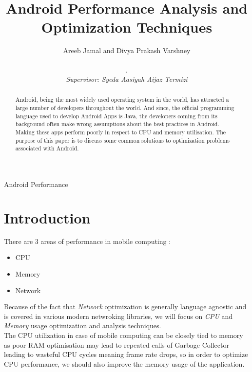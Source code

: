 \documentclass[journal]{IEEEtran}
\begin{document}
\title{Android Performance Analysis and \\ Optimization Techniques}

\author{Areeb Jamal and Divya Prakash Varshney \\
	 \\
	 \color{white}.\\\color{black}
 	\textit{Supervisor: Syeda Aasiyah Aijaz Termizi}}
 


%
{Android Performance}


\maketitle


\begin{abstract}
Android, being the most widely used operating system in the world, has attracted a large number of developers throughout the world. And since, the official programming language used to develop Android Apps is Java, the developers coming from its background often make wrong assumptions about the best practices in Android. Making these apps perform poorly in respect to CPU and memory utilisation. The purpose of this paper is to discuss some common solutions to optimization problems associated with Android.
\end{abstract}


\section{Introduction}
There are 3 areas of performance in mobile computing :
\begin{itemize}
	\item CPU
	\item Memory
	\item Network
\end{itemize}
Because of the fact that \emph{Network} optimization is generally language agnostic and is covered in various modern netwroking libraries, we will focus on \emph{CPU} and \emph{Memory} usage optimization and analysis techniques.\\
The CPU utilization in case of mobile computing can be closely tied to memory as poor RAM optimisation may lead to repeated calls of Garbage Collector leading to wasteful CPU cycles meaning frame rate drops, so in order to optimize CPU performance, we should also improve the memory usage of the application.
\end{document}
